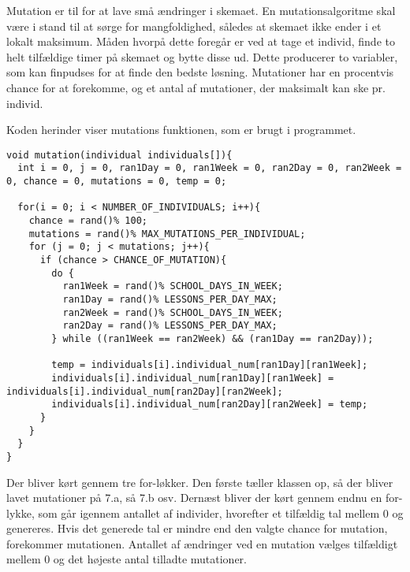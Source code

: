 Mutation er til for at lave små ændringer i skemaet. En mutationsalgoritme skal være i stand til at sørge for mangfoldighed, således at skemaet ikke ender i et lokalt maksimum. 
Måden hvorpå dette foregår er ved at tage et individ, finde to helt tilfældige timer på skemaet og bytte disse ud. Dette producerer to variabler, som kan finpudses for at finde den bedste løsning. Mutationer har en procentvis chance for at forekomme, og et antal af mutationer, der maksimalt kan ske pr. individ. 

Koden herinder viser mutations funktionen, som er brugt i programmet.
\begin{lstlisting}
void mutation(individual individuals[]){
  int i = 0, j = 0, ran1Day = 0, ran1Week = 0, ran2Day = 0, ran2Week = 0, chance = 0, mutations = 0, temp = 0;

  for(i = 0; i < NUMBER_OF_INDIVIDUALS; i++){
    chance = rand()% 100;
    mutations = rand()% MAX_MUTATIONS_PER_INDIVIDUAL;
    for (j = 0; j < mutations; j++){
      if (chance > CHANCE_OF_MUTATION){
        do {
          ran1Week = rand()% SCHOOL_DAYS_IN_WEEK;
          ran1Day = rand()% LESSONS_PER_DAY_MAX;
          ran2Week = rand()% SCHOOL_DAYS_IN_WEEK;
          ran2Day = rand()% LESSONS_PER_DAY_MAX;
        } while ((ran1Week == ran2Week) && (ran1Day == ran2Day));
        
        temp = individuals[i].individual_num[ran1Day][ran1Week];
        individuals[i].individual_num[ran1Day][ran1Week] =        individuals[i].individual_num[ran2Day][ran2Week];
        individuals[i].individual_num[ran2Day][ran2Week] = temp;
      }
    }
  }
}
\end{lstlisting}

Der bliver kørt gennem tre for-løkker. Den første tæller klassen op, så der bliver lavet mutationer på 7.a, så 7.b osv. Dernæst bliver der kørt gennem endnu en for-lykke, som går igennem antallet af individer, hvorefter et tilfældig tal mellem 0 og genereres. Hvis det generede tal er mindre end den valgte chance for mutation, forekommer mutationen. Antallet af ændringer ved en mutation vælges tilfældigt mellem 0 og det højeste antal tilladte mutationer.